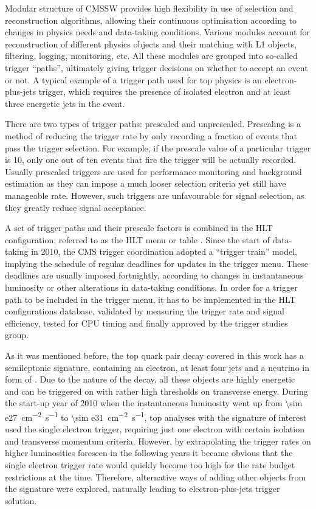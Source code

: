 Modular structure of CMSSW provides high flexibility in use of selection and reconstruction algorithms, allowing their
continuous optimisation according to changes in physics needs and data-taking conditions. Various modules account for
reconstruction of different physics objects and their matching with L1 objects, filtering, logging, monitoring, etc. All
these modules are grouped into so-called trigger ``paths'', ultimately giving trigger decisions on whether to accept an
event or not. A typical example of a trigger path used for top physics is an electron-plus-jets trigger, which requires
the presence of isolated electron and at least three energetic jets in the event.

There are two types of trigger paths: prescaled and unprescaled. Prescaling is a method of reducing the trigger rate by
only recording a fraction of events that pass the trigger selection. For example, if the prescale value of a particular
trigger is 10, only one out of ten events that fire the trigger will be actually recorded. Usually prescaled triggers
are used for performance monitoring and background estimation as they can impose a much looser selection criteria yet
still have manageable rate. However, such triggers are unfavourable for signal selection, as they greatly reduce signal
acceptance.

A set of trigger paths and their prescale factors is combined in the HLT configuration, referred to as the HLT menu or
table \autocite{HLT_commissioning}. Since the start of data-taking in 2010, the CMS trigger coordination adopted a
``trigger train'' model, implying the schedule of regular deadlines for updates in the trigger menu. These deadlines are
usually imposed fortnightly, according to changes in instantaneous luminosity or other alterations in data-taking
conditions. In order for a trigger path to be included in the trigger menu, it has to be implemented in the HLT
configurations database, validated by measuring the trigger rate and signal efficiency, tested for CPU timing and
finally approved by the trigger studies group.

As it was mentioned before, the top quark pair decay covered in this work has a semileptonic signature, containing an
electron, at least four jets and a neutrino in form of \MET. Due to the nature of the decay, all these objects are
highly energetic and can be triggered on with rather high thresholds on transverse energy. During the start-up year of
2010 when the instantaneous luminosity went up from \SI{\sim e27}{\cm^{-2}~s^{-1}} to \SI{\sim e31}{\cm^{-2}~s^{-1}},
top analyses with the signature of interest used the single electron trigger, requiring just one electron with certain
isolation and transverse momentum criteria. However, by extrapolating the trigger rates on higher luminosities foreseen
in the following years it became obvious that the single electron trigger rate would quickly become too high for the
rate budget restrictions at the time. Therefore, alternative ways of adding other objects from the \ttbar signature were
explored, naturally leading to electron-plus-jets trigger solution.

